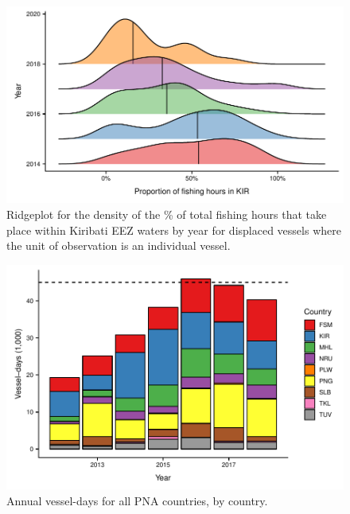 \documentclass[12pt]{article}
\begin{document}
\begin{figure}
\centering
	\includegraphics{img/hist_kir_fishing.pdf}
	\caption{\label{fig:hist_kir_fishing}Ridgeplot for the density of the \% of total fishing hours that take place within Kiribati EEZ waters by year for displaced vessels where the unit of observation is an individual vessel.}	
\end{figure}

\begin{figure}
\centering
	\includegraphics{img/all_PS_VDS_cty_year.pdf}
	\caption{\label{fig:all_PS_VDS_cty_year}Annual vessel-days for all PNA countries, by country.}
\end{figure}
\end{document}
